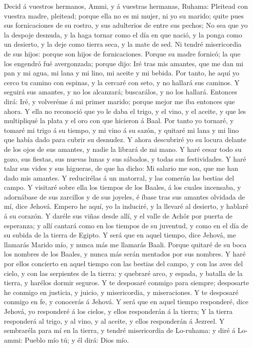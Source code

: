  Decid á vuestros hermanos, Ammi, y á vuestras hermanas,
Ruhama:  Pleitead con vuestra madre, pleitead; porque ella
no es mi mujer, ni yo su marido; quite pues sus fornicaciones de su
rostro, y sus adulterios de entre sus pechos;  No sea que
yo la despoje desnuda, y la haga tornar como el día en que nació, y la
ponga como un desierto, y la deje como tierra seca, y la mate de sed.
 Ni tendré misericordia de sus hijos: porque son hijos de
fornicaciones.  Porque su madre fornicó; la que los
engendró fué avergonzada; porque dijo: Iré tras mis amantes, que me dan
mi pan y mi agua, mi lana y mi lino, mi aceite y mi bebida.
 Por tanto, he aquí yo cerco tu camino con espinas, y la
cercaré con seto, y no hallará sus caminos.  Y seguirá sus
amantes, y no los alcanzará; buscarálos, y no los hallará. Entonces
dirá: Iré, y volveréme á mi primer marido; porque mejor me iba entonces
que ahora.  Y ella no reconoció que yo le daba el trigo, y
el vino, y el aceite, y que les multipliqué la plata y el oro con que
hicieron á Baal.  Por tanto yo tornaré, y tomaré mi trigo
á su tiempo, y mi vino á su sazón, y quitaré mi lana y mi lino que había
dado para cubrir su desnudez.  Y ahora descubriré yo su
locura delante de los ojos de sus amantes, y nadie la librará de mi
mano.  Y haré cesar todo su gozo, sus fiestas, sus nuevas
lunas y sus sábados, y todas sus festividades.  Y haré
talar sus vides y sus higueras, de que ha dicho: Mi salario me son, que
me han dado mis amantes. Y reducirélas á un matorral, y las comerán las
bestias del campo.  Y visitaré sobre ella los tiempos de
los Baales, á los cuales incensaba, y adornábase de sus zarcillos y de
sus joyeles, é íbase tras sus amantes olvidada de mí, dice Jehová.
 Empero he aquí, yo la induciré, y la llevaré al
desierto, y hablaré á su corazón.  Y daréle sus viñas
desde allí, y el valle de Achôr por puerta de esperanza; y allí cantará
como en los tiempos de su juventud, y como en el día de su subida de la
tierra de Egipto.  Y será que en aquel tiempo, dice
Jehová, me llamarás Marido mío, y nunca más me llamarás Baali.
 Porque quitaré de su boca los nombres de los Baales, y
nunca más serán mentados por sus nombres.  Y haré por
ellos concierto en aquel tiempo con las bestias del campo, y con las
aves del cielo, y con las serpientes de la tierra: y quebraré arco, y
espada, y batalla de la tierra, y harélos dormir seguros.
 Y te desposaré conmigo para siempre; desposarte he
conmigo en justicia, y juicio, y misericordia, y miseraciones.
 Y te desposaré conmigo en fe, y conocerás á Jehová.
 Y será que en aquel tiempo responderé, dice Jehová, yo
responderé á los cielos, y ellos responderán á la tierra;
 Y la tierra responderá al trigo, y al vino, y al aceite,
y ellos responderán á Jezreel.  Y sembraréla para mí en
la tierra, y tendré misericordia de Lo-ruhama: y diré á Lo-ammi: Pueblo
mío tú; y él dirá: Dios mío.

